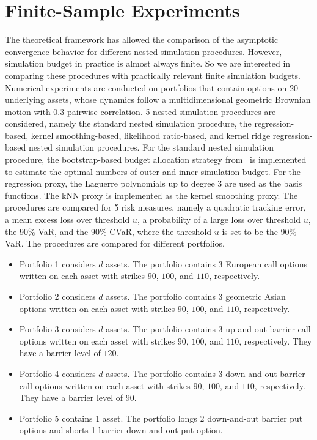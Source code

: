 \documentclass{article}
\begin{document}
\section{Finite-Sample Experiments} \label{sec:numerical-experiments}
The theoretical framework has allowed the comparison of the asymptotic convergence behavior for different nested simulation procedures.
However, simulation budget in practice is almost always finite.
So we are interested in comparing these procedures with practically relevant finite simulation budgets.
Numerical experiments are conducted on portfolios that contain options on 20 underlying assets, whose dynamics follow a multidimensional geometric Brownian motion with $0.3$ pairwise correlation.
5 nested simulation procedures are considered, namely the standard nested simulation procedure, the regression-based, kernel smoothing-based, likelihood ratio-based, and kernel ridge regression-based nested simulation procedures.
For the standard nested simulation procedure, the bootstrap-based budget allocation strategy from~\cite{zhang2021bootstrap} is implemented to estimate the optimal numbers of outer and inner simulation budget.
For the regression proxy, the Laguerre polynomials up to degree $3$ are used as the basis functions.
The kNN proxy is implemented as the kernel smoothing proxy.
The procedures are compared for 5 risk measures, namely a quadratic tracking error, a mean excess loss over threshold $u$, a probability of a large loss over threshold $u$, the 90\% VaR, and the 90\% CVaR, where the threshold $u$ is set to be the 90\% VaR.
The procedures are compared for different portfolios.
\begin{itemize}
    \item   Portfolio 1 considers $d$ assets.
    The portfolio contains 3 European call options written on each asset with strikes $90$, $100$, and $110$, respectively. 
    \item   Portfolio 2 considers $d$ assets.
    The portfolio contains 3 geometric Asian options written on each asset with strikes $90$, $100$, and $110$, respectively. 
    \item   Portfolio 3 considers $d$ assets.
    The portfolio contains 3 up-and-out barrier call options written on each asset with strikes $90$, $100$, and $110$, respectively. They have a barrier level of $120$.
    \item   Portfolio 4 considers $d$ assets.
    The portfolio contains 3 down-and-out barrier call options written on each asset with strikes $90$, $100$, and $110$, respectively. They have a barrier level of $90$.
    \item   Portfolio 5 contains 1 asset.
    The portfolio longs 2 down-and-out barrier put options and shorts 1 barrier down-and-out put option. 
\end{itemize}
\end{document}
